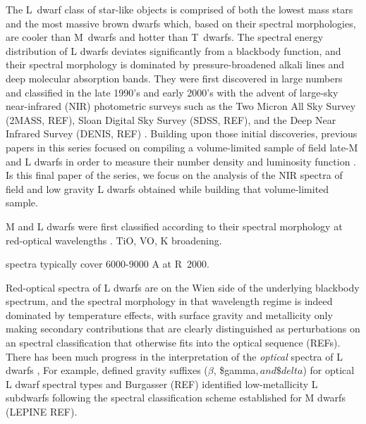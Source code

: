 \documentclass[12pt,preprint]{aastex}
\begin{document}
The L~dwarf class of star-like objects is comprised of both the lowest mass stars and the most massive brown dwarfs which, based on their spectral morphologies, are cooler than M~dwarfs and hotter than T~dwarfs. 
The spectral energy distribution of L dwarfs deviates significantly from a blackbody function, and their spectral morphology is dominated by pressure-broadened alkali lines and deep molecular absorption bands.  
They were first discovered in large numbers and classified in the late 1990's and early 2000's with the advent of large-sky near-infrared (NIR) photometric surveys such as the Two Micron All Sky Survey (2MASS, REF), Sloan Digital Sky Survey (SDSS, REF), and the Deep Near Infrared Survey (DENIS, REF) \citep{K99,Martin99,Kirkpatrick2005}.
Building upon those initial discoveries, previous papers in this series focused on compiling a volume-limited sample of field late-M and L dwarfs in order to measure their number density and luminosity function \citep[Papers V, IX, and X]{Cruz03,Cruz07,Reid08}. 
Is this final paper of the series, we focus on the analysis of the NIR spectra of field and low gravity L dwarfs obtained while building that volume-limited sample.

M and L dwarfs were first classified according to their spectral morphology at red-optical wavelengths \citep{K99,Kirkpatrick05}. 
TiO, VO, K broadening.

spectra typically cover 6000-9000 A at R~2000.

Red-optical spectra of L dwarfs are on the Wien side of the underlying blackbody spectrum, and the spectral morphology in that wavelength regime is indeed dominated by temperature effects, with surface gravity and metallicity only making secondary contributions that are clearly distinguished as perturbations on an spectral classification that otherwise fits into the optical sequence (REFs). 
There has been much progress in the interpretation of the \emph{optical} spectra of L dwarfs \citep{K99,Cruz09_lowg},
For example, \citet{Cruz09} defined gravity suffixes ($\beta$, \$gamma$, and \$delta$) for optical L dwarf spectral types and Burgasser (REF) identified low-metallicity L subdwarfs following the spectral classification scheme established for M dwarfs (LEPINE REF).  
\end{document}
